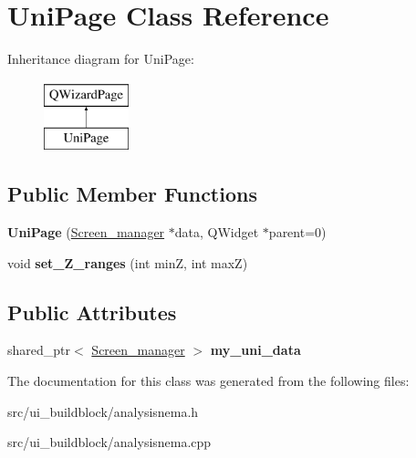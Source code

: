 \hypertarget{classUniPage}{}\section{Uni\+Page Class Reference}
\label{classUniPage}
Inheritance diagram for Uni\+Page\+:\begin{figure}[H]
\begin{center}
\leavevmode
\includegraphics[height=2.000000cm]{classUniPage}
\end{center}
\end{figure}
\subsection*{Public Member Functions}
\begin{DoxyCompactItemize}
\item 
\mbox{\label{classUniPage_a58341e8d05b190da5df04e307adc721f}} 
{\bfseries Uni\+Page} (\mbox{\hyperlink{classScreen__manager}{Screen\+\_\+manager}} $\ast$data, Q\+Widget $\ast$parent=0)
\item 
\mbox{\label{classUniPage_acbe74a1bca02521723071fe271d5d117}} 
void {\bfseries set\+\_\+\+Z\+\_\+ranges} (int minZ, int maxZ)
\end{DoxyCompactItemize}
\subsection*{Public Attributes}
\begin{DoxyCompactItemize}
\item 
\mbox{\label{classUniPage_a2a74a6fcf9e364d924f21faf61b73f23}} 
shared\+\_\+ptr$<$ \mbox{\hyperlink{classScreen__manager}{Screen\+\_\+manager}} $>$ {\bfseries my\+\_\+uni\+\_\+data}
\end{DoxyCompactItemize}


The documentation for this class was generated from the following files\+:\begin{DoxyCompactItemize}
\item 
src/ui\+\_\+buildblock/analysisnema.\+h\item 
src/ui\+\_\+buildblock/analysisnema.\+cpp\end{DoxyCompactItemize}
